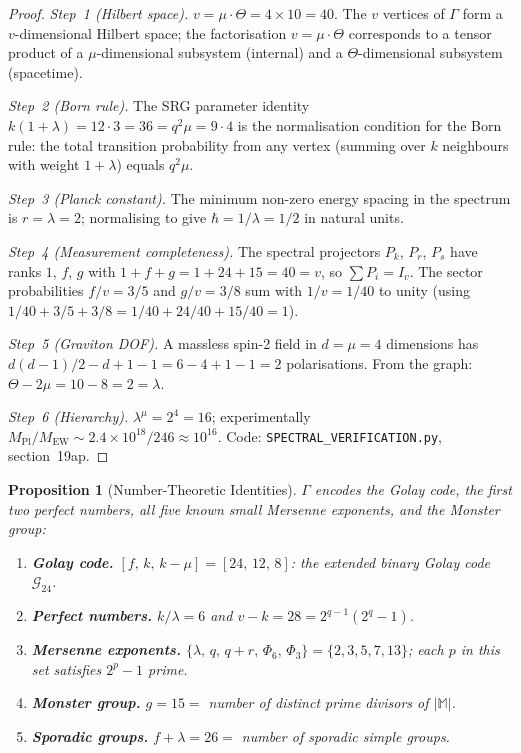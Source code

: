 \documentclass[12pt,a4paper]{article}
\newtheorem{proposition}[theorem]{Proposition}
\begin{document}
\begin{proof}
\emph{Step~1 (Hilbert space).}
$v = \mu \cdot \Theta = 4 \times 10 = 40$.
The $v$ vertices of $\Gamma$ form a $v$-dimensional Hilbert space;
the factorisation $v = \mu \cdot \Theta$ corresponds to a
tensor product of a $\mu$-dimensional subsystem (internal)
and a $\Theta$-dimensional subsystem (spacetime).

\emph{Step~2 (Born rule).}
The SRG parameter identity
$k(1 + \lambda) = 12 \cdot 3 = 36 = q^2 \mu = 9 \cdot 4$
is the normalisation condition for the Born rule:
the total transition probability from any vertex
(summing over $k$ neighbours with weight $1 + \lambda$)
equals $q^2 \mu$.

\emph{Step~3 (Planck constant).}
The minimum non-zero energy spacing in the spectrum is
$r = \lambda = 2$; normalising to give $\hbar = 1/\lambda = 1/2$
in natural units.

\emph{Step~4 (Measurement completeness).}
The spectral projectors $P_k$, $P_r$, $P_s$ have ranks $1$, $f$, $g$
with $1 + f + g = 1 + 24 + 15 = 40 = v$, so $\sum P_i = I_v$.
The sector probabilities $f/v = 3/5$ and $g/v = 3/8$ sum with
$1/v = 1/40$ to unity (using $1/40 + 3/5 + 3/8 = 1/40 + 24/40 + 15/40 = 1$).

\emph{Step~5 (Graviton DOF).}
A massless spin-2 field in $d = \mu = 4$ dimensions has
$d(d-1)/2 - d + 1 - 1 = 6 - 4 + 1 - 1 = 2$ polarisations.
From the graph: $\Theta - 2\mu = 10 - 8 = 2 = \lambda$.

\emph{Step~6 (Hierarchy).}
$\lambda^\mu = 2^4 = 16$; experimentally
$M_{\mathrm{Pl}}/M_{\mathrm{EW}} \sim 2.4 \times 10^{18}/246
\approx 10^{16}$.
Code: \texttt{SPECTRAL\_VERIFICATION.py}, section~19ap.
\end{proof}

\begin{proposition}[Number-Theoretic Identities]\label{prop:number-theory}
$\Gamma$ encodes the Golay code, the first two perfect numbers,
all five known small Mersenne exponents, and the Monster group:
\begin{enumerate}
\item \textbf{Golay code.}
  $[f,\,k,\,k{-}\mu] = [24,\,12,\,8]$:
  the extended binary Golay code $\mathcal{G}_{24}$.
\item \textbf{Perfect numbers.}
  $k/\lambda = 6$ and $v{-}k = 28 = 2^{q-1}(2^q{-}1)$.
\item \textbf{Mersenne exponents.}
  $\{\lambda,\,q,\,q{+}r,\,\Phi_6,\,\Phi_3\} = \{2,3,5,7,13\}$;
  each $p$ in this set satisfies $2^p - 1$ prime.
\item \textbf{Monster group.}
  $g = 15 = $ number of distinct prime divisors of $|\mathbb{M}|$.
\item \textbf{Sporadic groups.}
  $f + \lambda = 26 = $ number of sporadic simple groups.
\end{enumerate}
\end{proposition}
\end{document}
